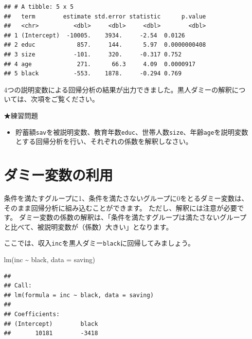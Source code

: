 \documentclass[
]{book}
\newenvironment{Shaded}{\begin{snugshade}}{\end{snugshade}}
\newcommand{\AttributeTok}[1]{\textcolor[rgb]{0.77,0.63,0.00}{#1}}
\newcommand{\FunctionTok}[1]{\textcolor[rgb]{0.00,0.00,0.00}{#1}}
\newcommand{\NormalTok}[1]{#1}
\newcommand{\SpecialCharTok}[1]{\textcolor[rgb]{0.00,0.00,0.00}{#1}}
\providecommand{\tightlist}{%
  \setlength{\itemsep}{0pt}\setlength{\parskip}{0pt}}
\begin{document}
\begin{verbatim}
## # A tibble: 5 x 5
##   term        estimate std.error statistic      p.value
##   <chr>          <dbl>     <dbl>     <dbl>        <dbl>
## 1 (Intercept)  -10005.    3934.     -2.54  0.0126      
## 2 educ            857.     144.      5.97  0.0000000408
## 3 size           -101.     320.     -0.317 0.752       
## 4 age             271.      66.3     4.09  0.0000917   
## 5 black          -553.    1878.     -0.294 0.769
\end{verbatim}

4つの説明変数による回帰分析の結果が出力できました。黒人ダミーの解釈については、次項をご覧ください。

★練習問題

\begin{itemize}
\tightlist
\item
  貯蓄額\texttt{sav}を被説明変数、教育年数\texttt{educ}、世帯人数\texttt{size}、年齢\texttt{age}を説明変数とする回帰分析を行い、それぞれの係数を解釈しなさい。
\end{itemize}

\hypertarget{ux30c0ux30dfux30fcux5909ux6570ux306eux5229ux7528}{%
\section{ダミー変数の利用}\label{ux30c0ux30dfux30fcux5909ux6570ux306eux5229ux7528}}

条件を満たすグループに1、条件を満たさないグループに0をとるダミー変数は、そのまま回帰分析に組み込むことができます。
ただし、解釈には注意が必要です。
ダミー変数の係数の解釈は、「条件を満たすグループは満たさないグループと比べて、被説明変数が（係数）大きい」となります。

ここでは、収入\texttt{inc}を黒人ダミー\texttt{black}に回帰してみましょう。

\begin{Shaded}
\begin{Highlighting}[]
\FunctionTok{lm}\NormalTok{(inc }\SpecialCharTok{\textasciitilde{}}\NormalTok{ black, }\AttributeTok{data =}\NormalTok{ saving)}
\end{Highlighting}
\end{Shaded}

\begin{verbatim}
## 
## Call:
## lm(formula = inc ~ black, data = saving)
## 
## Coefficients:
## (Intercept)        black  
##       10181        -3418
\end{verbatim}
\end{document}
